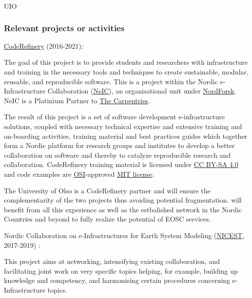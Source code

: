 \begin{sitedescription}{UIO}
\subsubsection*{Relevant projects or activities}

\begin{compactenum}
\item \href{https://coderefinery.org}{CodeRefinery} \label{desc:coderefinery} (2016-2021): 


The goal of this project is to provide students and researchers with infrastructure and training in the necessary tools and techniques to create sustainable, modular, reusable, and reproducible software.
This is a project within the Nordic e-Infrastructure Collaboration (\href{https://neic.no}{NeIC}), an organisational unit under \href{https://www.nordforsk.org/en}{NordForsk}.
NeIC is a Platinium Partner to \href{https://carpentries.org}{The Carpentries}.

The result of this project is a set of software development e-infrastructure solutions, coupled with necessary technical expertise and extensive training and on-boarding activities, training material and best practices guides which together form a Nordic platform for research groups and institutes to develop a better collaboration on software and thereby to catalyze reproducible research and collaboration.
\newline
CodeRefinery training material is licensed under \href{https://creativecommons.org/licenses/by-sa/4.0/}{CC BY-SA 4.0} and code examples are \href{https://opensource.org/}{OSI}-approved \href{https://opensource.org/licenses/mit-license.html}{MIT license}.

The University of Olso is a CodeRefinery partner and will ensure the complementarity of the two projects thus avoiding potential fragmentation. \TheProject will benefit from all this experience as well as the estbalished network in the Nordic Countries and beyond to fully realize the potential of \TheProject EOSC services. 
\newline


\item Nordic Collaboration on e-Infrastructures for Earth System Modeling (\href{https://neic.no/nicest}{NICEST}, 2017-2019) \label{desc:nicest}:

This project aims at networking, intensifying existing collaboration, and facilitating 
joint work on very specific topics helping, for example, building up knowledge and
competency, and harmonising certain procedures concerning e-Infrastructure topics.


\end{compactenum}
\end{sitedescription}
